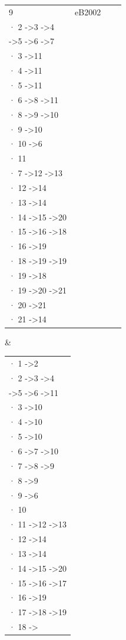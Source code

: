 \begin{table}
\begin{minipage}{0.5\textwidth}
\begin{tabular}{llll}
				9 & eB2002 & \begin{tabular}[c]{@{}l@{}}· 1 -\textgreater 2\\ · 2 -\textgreater 3 -\textgreater 4 \\ \enspace -\textgreater 5 -\textgreater 6 -\textgreater 7\\ · 3 -\textgreater 11\\ · 4 -\textgreater 11\\ · 5 -\textgreater 11\\ · 6 -\textgreater 8 -\textgreater 11\\ · 8 -\textgreater 9 -\textgreater 10\\ · 9 -\textgreater 10\\ · 10 -\textgreater 6\\ · 11\\ · 7 -\textgreater 12 -\textgreater 13\\ · 12 -\textgreater 14\\ · 13 -\textgreater 14\\ · 14 -\textgreater 15 -\textgreater 20\\ · 15 -\textgreater 16 -\textgreater 18\\ · 16 -\textgreater 19\\ · 18 -\textgreater 19 -\textgreater 19\\ · 19 -\textgreater 18\\ · 19 -\textgreater 20 -\textgreater 21\\ · 20 -\textgreater 21\\ · 21 -\textgreater 14\end{tabular} & \begin{tabular}[c]{@{}l@{}}· 1 -\textgreater 2\\ · 2 -\textgreater 3 -\textgreater 4  \\ \enspace -\textgreater 5 -\textgreater 6 -\textgreater 11\\ · 3 -\textgreater 10\\ · 4 -\textgreater 10\\ · 5 -\textgreater 10\\ · 6 -\textgreater 7 -\textgreater 10\\ · 7 -\textgreater 8 -\textgreater 9\\ · 8 -\textgreater 9\\ · 9 -\textgreater 6\\ · 10\\ · 11 -\textgreater 12 -\textgreater 13\\ · 12 -\textgreater 14\\ · 13 -\textgreater 14\\ · 14 -\textgreater 15 -\textgreater 20\\ · 15 -\textgreater 16 -\textgreater 17\\ · 16 -\textgreater 19\\ · 17 -\textgreater 18 -\textgreater 19\\ · 18 -\textgreater 
\end{tabular}
\end{minipage}
\end{table}
